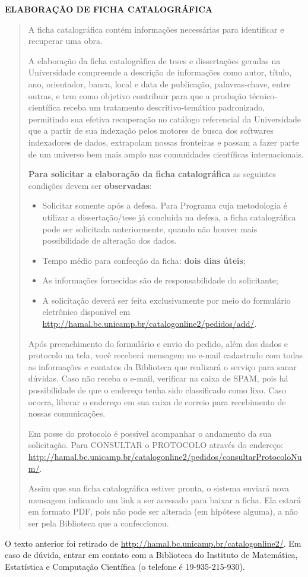 \begin{center}
  {\Large\textbf{ELABORAÇÃO DE FICHA CATALOGRÁFICA}}
\end{center}

\begin{quotation}
  A ficha catalográfica contém informações necessárias para identificar e
  recuperar uma obra.

  A elaboração da ficha catalográfica de teses e dissertações geradas na
  Universidade compreende a descrição de informações como autor, título, ano,
  orientador, banca, local e data de publicação, palavras-chave, entre outras, e
  tem como objetivo contribuir para que a produção técnico-científica receba um
  tratamento descritivo-temático padronizado, permitindo sua efetiva recuperação
  no catálogo referencial da Universidade que a partir de sua indexação pelos
  motores de busca dos softwares indexadores de dados, extrapolam nossas
  fronteiras e passam a fazer parte de um universo bem mais amplo nas
  comunidades científicas internacionais.

  \textbf{Para solicitar a elaboração da ficha catalográfica} as seguintes condições
  devem ser \textbf{observadas}:

  \begin{itemize}
    \item Solicitar somente após a defesa. Para Programa cuja metodologia é
      utilizar a dissertação/tese já concluída na defesa, a ficha catalográfica
      pode ser solicitada anteriormente, quando não houver mais possibilidade de
      alteração dos dados.
    \item Tempo médio para confecção da ficha: \textbf{dois dias úteis};
    \item As informações fornecidas são de responsabilidade do solicitante;
    \item A solicitação deverá ser feita exclusivamente por meio do formulário
      eletrônico disponível em
      \url{http://hamal.bc.unicamp.br/catalogonline2/pedidos/add/}.
  \end{itemize}

    Após preenchimento do formulário e envio do pedido, além dos dados e
    protocolo na tela, você receberá mensagem no e-mail cadastrado com todas as
    informações e contatos da Biblioteca que realizará o serviço para sanar
    dúvidas. Caso não receba o e-mail, verificar na caixa de SPAM, pois há
    possibilidade de que o endereço tenha sido classificado como lixo. Caso
    ocorra, liberar o endereço em sua caixa de correio para recebimento de
    nossas comunicações.

    Em posse do protocolo é possível acompanhar o andamento da sua solicitação.
    Para CONSULTAR o PROTOCOLO através do endereço:
    \url{http://hamal.bc.unicamp.br/catalogonline2/pedidos/consultarProtocoloNum/}.

    Assim que sua ficha catalográfica estiver pronta, o sistema enviará
    nova mensagem indicando um link a ser acessado para baixar a ficha. Ela
    estará em formato PDF, pois não pode ser alterada (em hipótese alguma), a
    não ser pela Biblioteca que a confeccionou.
\end{quotation}

O texto anterior foi retirado de
\url{http://hamal.bc.unicamp.br/catalogonline2/}. Em caso de dúvida, entrar em
contato com a Biblioteca do Instituto de Matemática, Estatística e Computação
Científica (o telefone é 19-935-215-930).

\thispagestyle{plain}  %